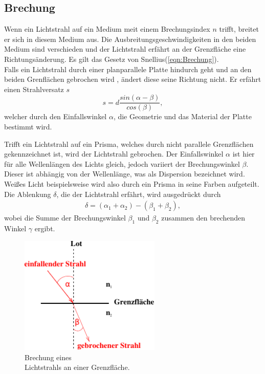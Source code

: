 \subsection{Brechung}
\label{subsec:Brechung}
\begin{minipage}[t]{0,5\textwidth}
    Wenn ein Lichtstrahl auf ein Medium meit einem Brechungsindex $n$ trifft, breitet er sich in diesem Medium aus. 
    Die Ausbreitungsgeschwindigkeiten in den beiden Medium sind verschieden und der Lichtstrahl erfährt an der Grenzfläche eine Richtungsänderung.
    Es gilt das Gesetz von Snellius(\ref{eqn:Brechung}).\\
    Falls ein Lichtstrahl durch einer planparallele Platte hindurch geht und an den beiden Grenflächen gebrochen wird , ändert diese seine Richtung nicht.
    Er erfährt einen Strahlversatz $s$
    \begin{equation}
        s = d\frac{sin(\alpha-\beta)}{cos(\beta)},
        \label{eqn:Strahlversatz}
    \end{equation}
    welcher durch den Einfallswinkel $\alpha$, die Geometrie und das Material der Platte bestimmt wird.

    Trifft ein Lichtstrahl auf ein Prisma, welches durch nicht parallele Grenzflächen gekennzeichnet ist, wird der Lichtstrahl gebrochen.
    Der Einfallswinkel $\alpha$ ist hier für alle Wellenlängen des Lichts gleich, jedoch variiert der Brechungswinkel $\beta$. Dieser
    ist abhängig von der Wellenlänge, was als Dispersion bezeichnet wird. Weißes Licht beispielsweise wird also durch ein Prisma in seine Farben aufgeteilt.
    Die Ablenkung $\delta$, die der Lichtstrahl erfährt, wird ausgedrückt durch
    \begin{align}
        \delta = (\alpha_1 + \alpha_2)- (\beta_1 + \beta_2),
        \label{eqn:Ablenkung}
    \end{align}
    wobei die Summe der Brechungswinkel $\beta_1$ und $\beta_2$ zusammen den brechenden Winkel $\gamma$ ergibt.
\end{minipage}
\begin{minipage}[t]{0,5\textwidth}
    \begin{figure}[H]
        \centering
        \includegraphics[width=0.6\textwidth]{build/Abb_2b.pdf}
        \caption {Brechung eines \\Lichtstrahls an einer Grenzfläche\cite[2]{V400}.}
        \label{fig:Abb_1}
    \end{figure}

\end{minipage}
